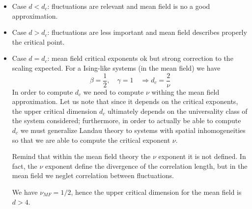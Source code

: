 \documentclass[../main/main.tex]{subfiles}
\begin{document}
\begin{itemize}
\item Case \( d < d_c \): fluctuations are relevant and mean field is no a good approximation.
\item Case \( d > d_c \): fluctuations are less important and mean field describes properly the critical point.
\item Case \( d = d_c \): mean field critical exponents ok but strong correction to the scaling expected. For a Ising-like systems (in the mean field) we have
\begin{equation*}
  \beta = \frac{1}{2}, \quad \gamma =1 \quad \Rightarrow d_c = \frac{2}{\nu}
\end{equation*}
In order to compute \( d_c \) we need to compute \( \nu  \) withing the mean field approximation. Let us note that since it depends on the critical exponents, the upper critical dimension \( d_c \)  ultimately depends on the universality class of the system considered; furthermore, in order to actually be able to compute \( d_c \)  we must generalize Landau theory to systems with spatial inhomogeneities so that we are able to compute the critical exponent \( \nu  \).

\begin{remark}
Remind that within the mean field theory the \( \nu  \) exponent it is not defined. In fact, the \( \nu  \) exponent define the divergence of the correlation length, but in the mean field we neglet correlation between fluctuations.

We have \( \nu _{MF} = 1/2 \), hence the upper critical dimension for the mean field is \( d>4 \).
\end{remark}


\end{itemize}


\end{document}
